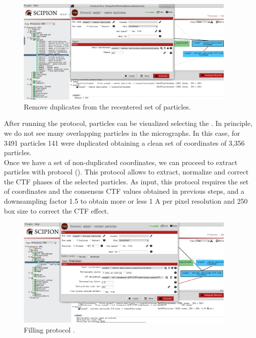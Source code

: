 \begin{figure}[H]
  \centering
  \captionsetup{width=.8\linewidth} 
  \includegraphics[width=0.95\textwidth]
  {images/7d_xmipp3_removeduplicates.pdf}
  \caption{Remove duplicates from the recentered set of particles.}
  \label{fig:xmipp3_removeDup}
  \end{figure}
  
After running the protocol, particles can be visualized selecting the . In principle, we do not see many overlapping particles in the micrographs. In this case, for 3491 particles 141 were duplicated obtaining a clean set of coordinates of 3,356 particles.\\

Once we have a set of non-duplicated coordinates, we can proceed to extract particles with  protocol  (). This protocol allows to extract, normalize and correct the CTF phases of the selected particles. As input, this protocol requires the set of coordinates and the consensus CTF values obtained in previous steps, and a downsampling factor 1.5 to obtain more or less 1 A per pixel resolution and 250 box size to correct the CTF effect.

\begin{figure}[H]
  \centering
  \captionsetup{width=.8\linewidth} 
  \includegraphics[width=0.95\textwidth]
  {images/7e_xmipp3_extractparticles.pdf}
  \caption{Filling protocol .}
  \label{fig:xmipp_extract_particles2}
  \end{figure}

